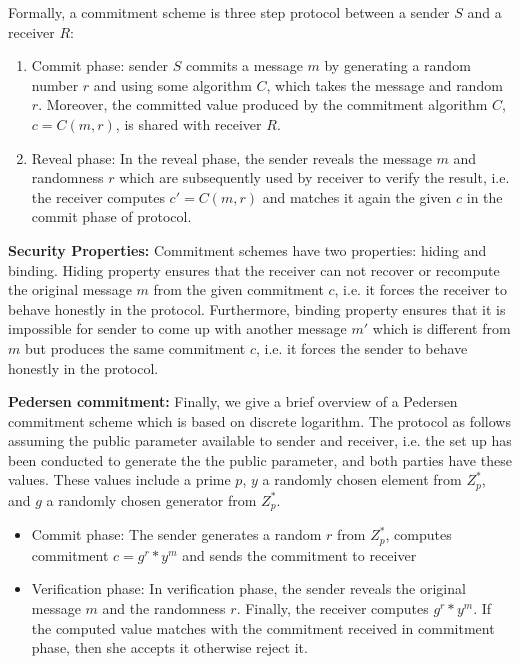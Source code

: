 {      
      Formally, a commitment scheme is three step protocol between a sender $S$ and a receiver $R$:
      \begin{enumerate}
      \item Commit phase: sender $S$ commits a message $m$ by generating a random number $r$ and using some algorithm $C$, which takes the message 
      and random $r$. Moreover, the committed value produced by the commitment algorithm $C$, $c = C(m, r)$, is shared with receiver $R$.
      \item Reveal phase: In the reveal phase, the sender reveals the message $m$ and randomness $r$ which are subsequently used by 
         receiver to verify the result, i.e. the receiver computes  $c' = C(m, r)$ and matches it again the given $c$ in the commit phase of protocol. 
      \end{enumerate}
      
      
    \textbf{Security Properties:} 
     Commitment schemes have two properties: hiding and binding. Hiding property ensures that 
     the receiver can not recover or recompute the original message $m$ from the given commitment $c$, i.e. 
     it forces the receiver to behave honestly in the protocol. 
     Furthermore, binding property ensures that it is impossible for sender to come up with 
     another message $m'$ which is different from $m$ but produces the same commitment $c$, i.e. 
     it forces the sender to behave honestly in the protocol. 
     
    \textbf{Pedersen commitment:}
     Finally, we give a brief overview of a Pedersen commitment scheme which is based on discrete logarithm.  The protocol as follows assuming 
     the public parameter available to sender and receiver, i.e. the set up has been conducted to generate the the public parameter, 
     and both parties have these values. These values include a prime $p$, $y$ a randomly chosen element from $Z_{p}^{*}$, and $g$ 
     a randomly chosen generator from   $Z_{p}^{*}$.  
     
     \begin{itemize}
     \item Commit phase: The sender generates a random $r$ from $Z_{p}^{*}$, computes commitment $c = g^{r}*y^{m}$ and sends the commitment to 
        receiver
      \item Verification phase: In verification phase, the sender reveals the original message $m$ and the randomness $r$. Finally, 
            the receiver computes  $g^{r}*y^{m}$. If the computed  value matches with the commitment received in 
            commitment phase, then she accepts it otherwise reject it. 
     

\end{itemize}}
